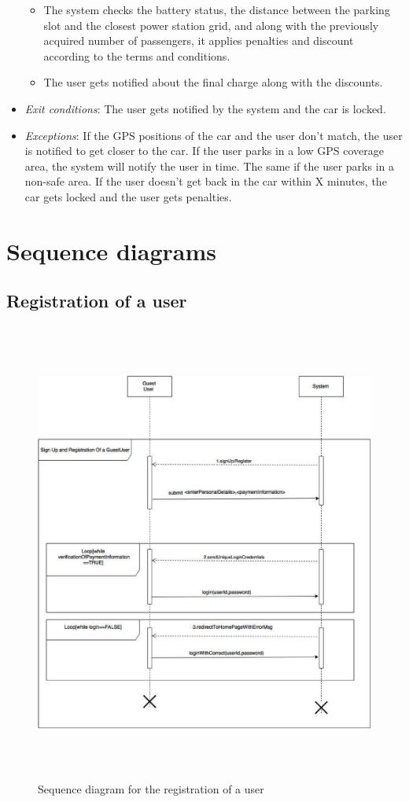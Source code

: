 \begin{itemize}
\begin{itemize}
		\item The system checks the battery status, the distance between the parking slot and the closest power station grid, and along with the previously acquired number of passengers, it applies penalties and discount according to the terms and conditions.
		\item The user gets notified about the final charge along with the discounts.
	\end{itemize}
	\item \emph{Exit conditions}: The user gets notified by the system and the car is locked.
	\item \emph{Exceptions}: If the GPS positions of the car and the user don't match, the user is notified to get closer to the car. If the user parks in a low GPS coverage area, the system will notify the user in time. The same if the user parks in a non-safe area. If the user doesn't get back in the car within X minutes, the car gets locked and the user gets penalties.
\end{itemize}

\newpage
\section{Sequence diagrams}

\subsection{Registration of a user}
\begin{figure}[h]
	\centering
	\includegraphics[height=15.2cm,keepaspectratio]{figures/sequence_register.eps}
	\caption{Sequence diagram for the registration of a user}
	\label{fig:sequence_register}
\end{figure}

